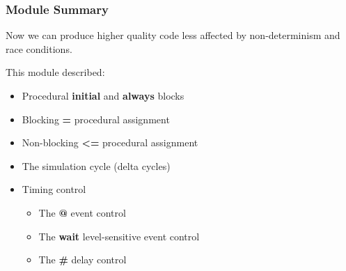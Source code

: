 \documentclass[t, notes, xcolor=table]{beamer}
\begin{document}
\begin{frame}
\frametitle{Module Summary}
Now we can produce higher quality code less affected by non-determinism and race conditions.
\newline

This module described:
\begin{itemize}
\item Procedural \textbf{initial} and \textbf{always} blocks
\item Blocking \textbf{=} procedural assignment
\item Non-blocking \textbf{\textless =} procedural assignment
\item The simulation cycle (delta cycles)
\item Timing control
\begin{itemize}
	\item The \textbf{@} event control
	\item The \textbf{wait} level-sensitive event control
	\item The \textbf{\#} delay control
\end{itemize}
\end{itemize}
\end{frame}
\end{document}
